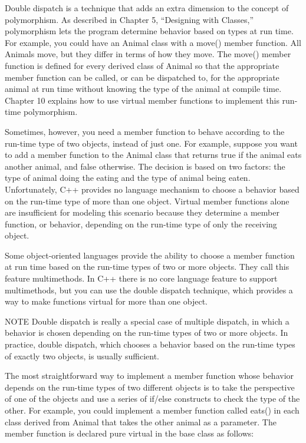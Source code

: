 
Double dispatch is a technique that adds an extra dimension to the concept of polymorphism. As described in Chapter 5, “Designing with Classes,” polymorphism lets the program determine behavior based on types at run time. For example, you could have an Animal class with a move() member function. All Animals move, but they differ in terms of how they move. The move() member function is defined for every derived class of Animal so that the appropriate member function can be called, or can be dispatched to, for the appropriate animal at run time without knowing the type of the animal at compile time. Chapter 10 explains how to use virtual member functions to implement this run-time polymorphism.

Sometimes, however, you need a member function to behave according to the run-time type of two objects, instead of just one. For example, suppose you want to add a member function to the Animal class that returns true if the animal eats another animal, and false otherwise. The decision is based on two factors: the type of animal doing the eating and the type of animal being eaten. Unfortunately, C++ provides no language mechanism to choose a behavior based on the run-time type of more than one object. Virtual member functions alone are insufficient for modeling this scenario because they determine a member function, or behavior, depending on the run-time type of only the receiving object.

Some object-oriented languages provide the ability to choose a member function at run time based on the run-time types of two or more objects. They call this feature multimethods. In C++ there is no core language feature to support multimethods, but you can use the double dispatch technique, which provides a way to make functions virtual for more than one object.

\begin{myNotic}{NOTE}
Double dispatch is really a special case of multiple dispatch, in which a behavior is chosen depending on the run-time types of two or more objects. In practice, double dispatch, which chooses a behavior based on the run-time types of exactly two objects, is usually sufficient.
\end{myNotic}


The most straightforward way to implement a member function whose behavior depends on the run-time types of two different objects is to take the perspective of one of the objects and use a series of if/else constructs to check the type of the other. For example, you could implement a member function called eats() in each class derived from Animal that takes the other animal as a parameter. The member function is declared pure virtual in the base class as follows:

